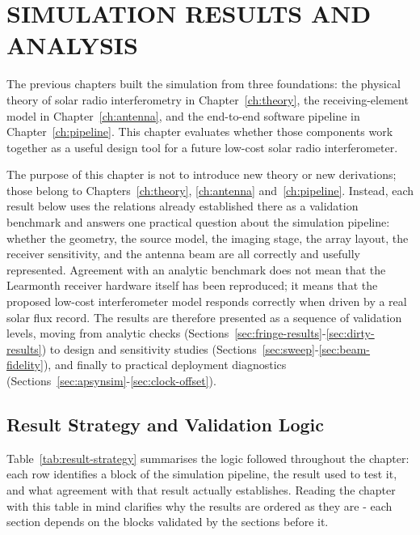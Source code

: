 \chapter{SIMULATION RESULTS AND ANALYSIS}
\label{ch:results}

The previous chapters built the simulation from three foundations: the physical
theory of solar radio interferometry in Chapter~\ref{ch:theory}, the receiving-element
model in Chapter~\ref{ch:antenna}, and the end-to-end software pipeline in
Chapter~\ref{ch:pipeline}. This chapter evaluates whether those components work
together as a useful design tool for a future low-cost solar radio interferometer.

The purpose of this chapter is not to introduce new theory or new derivations; those
belong to Chapters~\ref{ch:theory}, \ref{ch:antenna} and~\ref{ch:pipeline}. Instead,
each result below uses the relations already established there as a validation
benchmark and answers one practical question about the simulation pipeline: whether
the geometry, the source model, the imaging stage, the array layout, the receiver
sensitivity, and the antenna beam are all correctly and usefully represented.
Agreement with an analytic benchmark does not mean that the Learmonth receiver
hardware itself has been reproduced; it means that the proposed low-cost
interferometer model responds correctly when driven by a real solar flux record.
The results are therefore presented as a sequence of validation levels, moving from
analytic checks (Sections~\ref{sec:fringe-results}-\ref{sec:dirty-results}) to design
and sensitivity studies (Sections~\ref{sec:sweep}-\ref{sec:beam-fidelity}), and
finally to practical deployment diagnostics (Sections~\ref{sec:apsynsim}-\ref{sec:clock-offset}).

\section{Result Strategy and Validation Logic}
\label{sec:result-strategy}

Table~\ref{tab:result-strategy} summarises the logic followed throughout the chapter:
each row identifies a block of the simulation pipeline, the result used to test it,
and what agreement with that result actually establishes. Reading the chapter with
this table in mind clarifies why the results are ordered as they are - each section
depends on the blocks validated by the sections before it.

